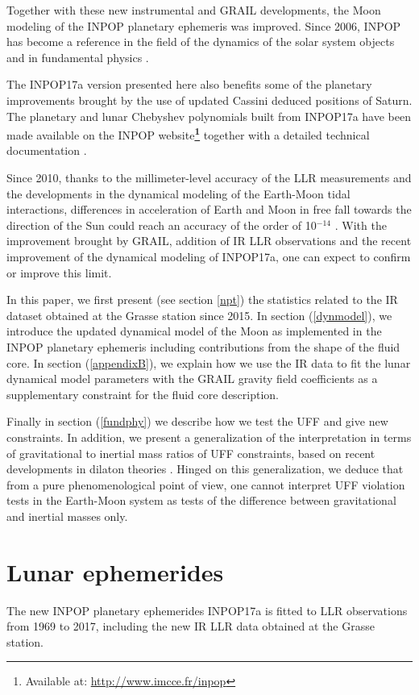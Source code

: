 \documentclass[fleqn,usenatbib,referee]{mnras}
\begin{document}
Together with these new instrumental and GRAIL developments, the Moon modeling of the INPOP planetary ephemeris was improved. Since 2006, INPOP has become a reference in the field of the dynamics of the solar system objects and in fundamental physics \cite[]{fienga:2011cm,Fienga2016a}.

The INPOP17a version presented here also benefits some of the planetary improvements brought by the use of updated Cassini deduced positions of Saturn. The planetary and lunar Chebyshev polynomials built from INPOP17a have been made available on the INPOP website\textbf{\footnote{Available at: \url{http://www.imcce.fr/inpop}}} together with a detailed technical documentation \cite[]{Viswanathan2017a}.

Since 2010, thanks to the millimeter-level accuracy of the LLR measurements and the developments in the dynamical modeling of the Earth-Moon tidal interactions, differences in acceleration of Earth and Moon in free fall towards the direction of the Sun could reach an accuracy of the order of 10$^{-14}$ \cite[]{2010LRR....13....7M,Williams2012}. With the improvement brought by GRAIL, addition of IR LLR observations and the recent improvement of the dynamical modeling of INPOP17a, one can expect to confirm or improve this limit.

In this paper, we first present (see section \ref{npt}) the statistics related to the IR dataset obtained at the Grasse station since 2015. In section (\ref{dynmodel}), we introduce the updated dynamical model of the Moon as implemented in the INPOP planetary ephemeris including contributions from the shape of the fluid core. In section (\ref{appendixB}), we explain how we use the IR data to fit the lunar dynamical model parameters with the GRAIL gravity field coefficients as a supplementary constraint for the fluid core description.

Finally in section (\ref{fundphy}) we describe how we test the UFF and give new constraints. In addition, we present a generalization of the interpretation in terms of gravitational to inertial mass ratios of UFF constraints, based on recent developments in dilaton theories \cite[]{hees:2015ax,minazzoli:2016pr}. Hinged on this generalization, we deduce that from a pure phenomenological point of view, one cannot interpret UFF violation tests in the Earth-Moon system as tests of the difference between gravitational and inertial masses only.

\section{Lunar ephemerides}
The new INPOP planetary ephemerides INPOP17a \citep[]{Viswanathan2017a} is fitted to LLR observations from 1969 to 2017, including the new IR LLR data obtained at the Grasse station.
\end{document}
